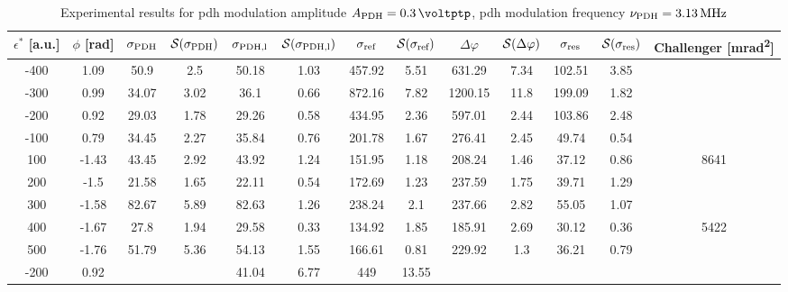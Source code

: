\begin{landscape}
	
	\begin{table}
	\centering
	\begin{tabular}{|c|c|c|c|c|c|c|c|c|c|c|c|c|}
		\hline
		$\epsilon^*$ [a.u.] & $\phi$ [\si{\radian}] & $\sigma_{\text{PDH}}$ & $\mathcal{S}(\sigma_{\text{PDH}})$ & $\sigma_{\text{PDH,l}}$ & $\mathcal{S}(\sigma_{\text{PDH,l}})$  & $\sigma_{\text{ref}}$ & $\mathcal{S}(\sigma_{\text{ref}})$ & $\Delta \varphi$ & $\mathcal{S}(\Delta \varphi)$ & $\sigma_{\text{res}}$  & $\mathcal{S}(\sigma_{\text{res}})$ & Challenger [\si{\milli\radian\squared}] \\
		\hline
		\hline
		-400 & 1.09 & 50.9 & 2.5 & 50.18 & 1.03 & 457.92 & 5.51 & 631.29 & 7.34 & 102.51 & 3.85 & \\
		-300 & 0.99 & 34.07 & 3.02 & 36.1 & 0.66 & 872.16 & 7.82 & 1200.15 & 11.8 & 199.09 & 1.82 & \\
		-200 & 0.92 & 29.03 & 1.78 & 29.26 & 0.58 & 434.95 & 2.36 & 597.01 & 2.44 & 103.86 & 2.48 & \\
		-100 & 0.79 & 34.45 & 2.27 & 35.84 & 0.76 & 201.78 & 1.67 & 276.41 & 2.45 & 49.74 & 0.54 & \\
		100 & -1.43 & 43.45 & 2.92 & 43.92 & 1.24 & 151.95 & 1.18 & 208.24 & 1.46 & 37.12 & 0.86 & 8641\\
		200 & -1.5 & 21.58 & 1.65 & 22.11 & 0.54 & 172.69 & 1.23 & 237.59 & 1.75 & 39.71 & 1.29 & \\
		300 & -1.58 & 82.67 & 5.89 & 82.63 & 1.26 & 238.24 & 2.1 & 237.66 & 2.82 & 55.05 & 1.07 & \\
		400 & -1.67 & 27.8 & 1.94 & 29.58 & 0.33 & 134.92 & 1.85 & 185.91 & 2.69 & 30.12 & 0.36 & 5422\\
		500 & -1.76 & 51.79 & 5.36 & 54.13 & 1.55 & 166.61 & 0.81 & 229.92 & 1.3 & 36.21 & 0.79 & \\
		\hline
		\hline
		-200 & 0.92 & & & 41.04 & 6.77 & 449 & 13.55 & & & & & \\
		\hline
	\end{tabular}
	\caption{Experimental results for \gls{pdh} modulation amplitude $\tind{A}{PDH} = \SI{0.3}{\voltptp}$, \gls{pdh} modulation frequency $\nu_{\text{PDH}} = \SI{3.13}{\mega\hertz}$}
	\end{table}
	
	

\end{landscape}
